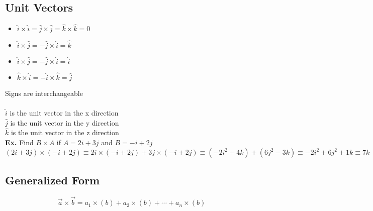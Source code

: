 \documentclass[]{article}
\begin{document}
\subsection*{Unit Vectors}
\begin{itemize}
    \item $\hat{i}\times\hat{i}=\hat{j}\times\hat{j}=\hat{k}\times\hat{k} = 0$
    \item $\hat{i}\times\hat{j}=-\hat{j}\times\hat{i}=\hat{k}$
    \item $\hat{i}\times\hat{j}=-\hat{j}\times\hat{i}=\hat{i}$
    \item $\hat{k}\times\hat{i}=-\hat{i}\times\hat{k}=\hat{j}$
\end{itemize}
Signs are interchangeable\\\\
$\hat{i}$ is the unit vector in the x direction\\
$\hat{j}$ is the unit vector in the y direction\\
$\hat{k}$ is the unit vector in the z direction\\

\textbf{Ex.} Find $B\times A$ if $A = 2i+3j$ and $B = -i+2j$\\ 
$(2i + 3j) \times (-i+2j) \equiv 2i\times(-i+2j) + 3j\times(-i+2j) \equiv (-2i^2+ 4k) + (6j^2 - 3k) \equiv -2i^2 +6j^2 + 1k \equiv 7k$\\


\subsection*{Generalized Form}
\begin{equation*}
    \vec{a}\times\vec{b}= a_1\times(b) + a_2\times(b) + \cdots + a_n\times(b)
\end{equation*}
\end{document}
